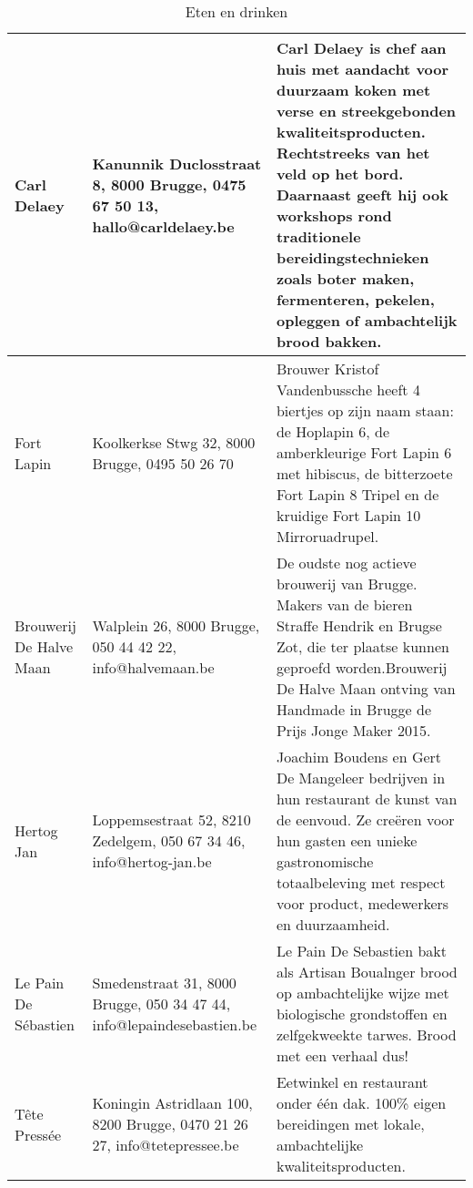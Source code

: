 \newpage
\begin{longtabu} to \textwidth {XXX}
\caption{Eten en drinken}\label{table:erkende-makers-eten-en-drinken}\\ \hline
Carl Delaey & Kanunnik Duclosstraat 8, 8000 Brugge, 0475 67 50 13, hallo@carldelaey.be & Carl Delaey is chef aan huis met aandacht voor duurzaam koken met verse en streekgebonden kwaliteitsproducten. Rechtstreeks van het veld op het bord. Daarnaast geeft hij ook workshops rond traditionele bereidingstechnieken zoals boter maken, fermenteren, pekelen, opleggen of ambachtelijk brood bakken. \\ \hline
Fort Lapin & Koolkerkse Stwg 32, 8000 Brugge, 0495 50 26 70 & Brouwer Kristof Vandenbussche heeft 4 biertjes op zijn naam staan: de Hoplapin 6, de amberkleurige Fort Lapin 6 met hibiscus, de bitterzoete Fort Lapin 8 Tripel en de kruidige Fort Lapin 10 Mirroruadrupel. \\ \hline
Brouwerij De Halve Maan & Walplein 26, 8000 Brugge, 050 44 42 22, info@halvemaan.be & De oudste nog actieve brouwerij van Brugge. Makers van de bieren Straffe Hendrik en Brugse Zot, die ter plaatse kunnen geproefd worden.Brouwerij De Halve Maan ontving van Handmade in Brugge de Prijs Jonge Maker 2015. \\ \hline
Hertog Jan & Loppemsestraat 52, 8210 Zedelgem, 050 67 34 46, info@hertog-jan.be & Joachim Boudens en Gert De Mangeleer bedrijven in hun restaurant de kunst van de eenvoud. Ze creëren voor hun gasten een unieke gastronomische totaalbeleving met respect voor product, medewerkers en duurzaamheid. \\ \hline
Le Pain De Sébastien & Smedenstraat 31, 8000 Brugge, 050 34 47 44, info@lepaindesebastien.be & Le Pain De Sebastien bakt als Artisan Boualnger brood op ambachtelijke wijze met biologische grondstoffen en zelfgekweekte tarwes. Brood met een verhaal dus! \\ \hline
Tête Pressée & Koningin Astridlaan 100, 8200 Brugge, 0470 21 26 27, info@tetepressee.be & Eetwinkel en restaurant onder één dak. 100\% eigen bereidingen met lokale, ambachtelijke kwaliteitsproducten.
\end{longtabu}


